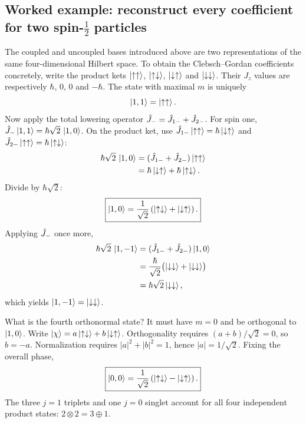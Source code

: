 \subsection*{Worked example: reconstruct every coefficient for two spin-$\frac12$ particles}
The coupled and uncoupled bases introduced above are two
representations of the same four-dimensional Hilbert space.
To obtain the Clebsch--Gordan coefficients concretely,
write the product kets
$\left|\uparrow\uparrow\right\rangle$,
$\left|\uparrow\downarrow\right\rangle$,
$\left|\downarrow\uparrow\right\rangle$ and
$\left|\downarrow\downarrow\right\rangle$.
Their $J_z$ values are respectively
$\hbar$, $0$, $0$ and $-\hbar$.
The state with maximal $m$ is uniquely
\begin{equation}
\left|1,1\right\rangle=\left|\uparrow\uparrow\right\rangle.
\end{equation}
Now apply the total lowering operator
$\hat{J}_-=\hat{J}_{1-}+\hat{J}_{2-}$.
For spin one, $\hat{J}_-\left|1,1\right\rangle
=\hbar\sqrt2\,\left|1,0\right\rangle$.
On the product ket, use
$\hat{J}_{1-}\left|\uparrow\uparrow\right\rangle
=\hbar\left|\downarrow\uparrow\right\rangle$ and
$\hat{J}_{2-}\left|\uparrow\uparrow\right\rangle
=\hbar\left|\uparrow\downarrow\right\rangle$:
\begin{align}
\hbar\sqrt2\,\left|1,0\right\rangle
&=(\hat{J}_{1-}+\hat{J}_{2-})
  \left|\uparrow\uparrow\right\rangle\notag\\
&=\hbar\left|\downarrow\uparrow\right\rangle
 +\hbar\left|\uparrow\downarrow\right\rangle.
\end{align}
Divide by $\hbar\sqrt2$:
\begin{equation}
\boxed{\left|1,0\right\rangle=\frac1{\sqrt2}
\left(\left|\uparrow\downarrow\right\rangle
+\left|\downarrow\uparrow\right\rangle\right).}
\end{equation}
Applying $\hat{J}_-$ once more,
\begin{equation}
\begin{aligned}
\hbar\sqrt2\,\left|1,-1\right\rangle
&=(\hat{J}_{1-}+\hat{J}_{2-})\left|1,0\right\rangle\\
&=\frac{\hbar}{\sqrt2}
 \bigl(\left|\downarrow\downarrow\right\rangle
      +\left|\downarrow\downarrow\right\rangle\bigr)\\
&=\hbar\sqrt2\left|\downarrow\downarrow\right\rangle,
\end{aligned}
\end{equation}
which yields $\left|1,-1\right\rangle=\left|\downarrow\downarrow\right\rangle$.

What is the fourth orthonormal state? It must have $m=0$
and be orthogonal to $\left|1,0\right\rangle$. Write
$\left|\chi\right\rangle=a\left|\uparrow\downarrow\right\rangle
+b\left|\downarrow\uparrow\right\rangle$.
Orthogonality requires
$(a+b)/\sqrt2=0$, so $b=-a$.
Normalization requires $|a|^2+|b|^2=1$,
hence $|a|=1/\sqrt2$. Fixing the overall phase,
\begin{equation}
\boxed{\left|0,0\right\rangle=\frac1{\sqrt2}
\left(\left|\uparrow\downarrow\right\rangle
-\left|\downarrow\uparrow\right\rangle\right).}
\end{equation}
The three $j=1$ triplets and one $j=0$ singlet
account for all four independent product states:
$2\otimes2=3\oplus1$.


